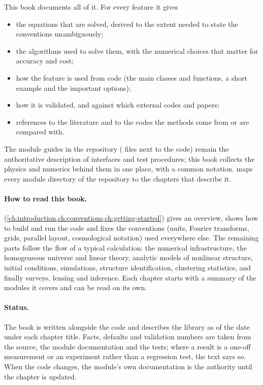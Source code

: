 This book documents all of it. For every feature it gives
\begin{itemize}
\item the equations that are solved, derived to the extent needed to state the conventions unambiguously;
\item the algorithms used to solve them, with the numerical choices that matter for accuracy and cost;
\item how the feature is used from code (the main classes and functions, a short example and the important options);
\item how it is validated, and against which external codes and papers;
\item references to the literature and to the codes the methods come from or are compared with.
\end{itemize}
The module guides in the repository ( files next to the code) remain the authoritative description of
interfaces and test procedures; this book collects the physics and numerics behind them in one place, with a common
notation.  maps every module directory of the repository to the chapters that describe it.

\paragraph*{How to read this book.}  (\cref{ch:introduction,ch:conventions,ch:getting-started}) gives an overview, shows how to build and run the code and
fixes the conventions (units, Fourier transforms, grids, parallel layout, cosmological notation) used everywhere
else. The remaining parts follow the flow of a typical calculation: the numerical infrastructure, the homogeneous
universe and linear theory, analytic models of nonlinear structure, initial conditions, simulations, structure
identification, clustering statistics, and finally surveys, lensing and inference. Each chapter starts with a summary
of the modules it covers and can be read on its own.

\paragraph*{Status.} The book is written alongside the code and describes the library as of the date under each
chapter title. Facts, defaults and validation numbers are taken from the source, the module documentation and the
tests; where a result is a one-off measurement or an experiment rather than a regression test, the text says so. When
the code changes, the module's own documentation is the authority until the chapter is updated.
